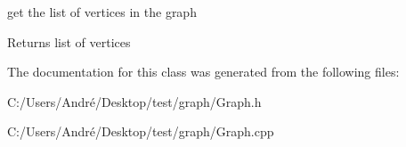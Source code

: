 get the list of vertices in the graph 

\begin{DoxyReturn}{Returns}
list of vertices 
\end{DoxyReturn}


The documentation for this class was generated from the following files\+:\begin{DoxyCompactItemize}
\item 
C\+:/\+Users/\+André/\+Desktop/test/graph/Graph.\+h\item 
C\+:/\+Users/\+André/\+Desktop/test/graph/Graph.\+cpp\end{DoxyCompactItemize}

